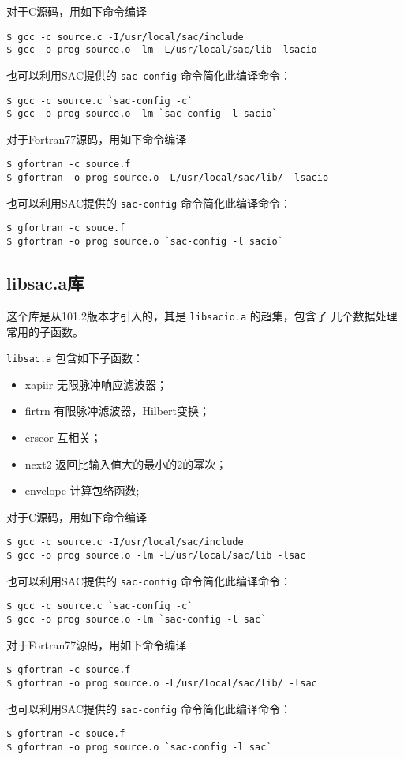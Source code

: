 对于C源码，用如下命令编译
\begin{verbatim}
$ gcc -c source.c -I/usr/local/sac/include
$ gcc -o prog source.o -lm -L/usr/local/sac/lib -lsacio
\end{verbatim}
也可以利用SAC提供的 \texttt{sac-config} 命令简化此编译命令：
\begin{verbatim}
$ gcc -c source.c `sac-config -c`
$ gcc -o prog source.o -lm `sac-config -l sacio`
\end{verbatim}

对于Fortran77源码，用如下命令编译
\begin{verbatim}
$ gfortran -c source.f
$ gfortran -o prog source.o -L/usr/local/sac/lib/ -lsacio
\end{verbatim}
也可以利用SAC提供的 \texttt{sac-config} 命令简化此编译命令：
\begin{verbatim}
$ gfortran -c souce.f
$ gfortran -o prog source.o `sac-config -l sacio`
\end{verbatim}

\subsection{libsac.a库}
这个库是从101.2版本才引入的，其是 \texttt{libsacio.a} 的超集，包含了
几个数据处理常用的子函数。

\texttt{libsac.a} 包含如下子函数：
\begin{itemize}
\item xapiir  无限脉冲响应滤波器；
\item firtrn  有限脉冲滤波器，Hilbert变换；
\item crscor  互相关；
\item next2   返回比输入值大的最小的2的幂次；
\item envelope 计算包络函数;
\end{itemize}

对于C源码，用如下命令编译
\begin{verbatim}
$ gcc -c source.c -I/usr/local/sac/include
$ gcc -o prog source.o -lm -L/usr/local/sac/lib -lsac
\end{verbatim}
也可以利用SAC提供的 \texttt{sac-config} 命令简化此编译命令：
\begin{verbatim}
$ gcc -c source.c `sac-config -c`
$ gcc -o prog source.o -lm `sac-config -l sac`
\end{verbatim}

对于Fortran77源码，用如下命令编译
\begin{verbatim}
$ gfortran -c source.f
$ gfortran -o prog source.o -L/usr/local/sac/lib/ -lsac
\end{verbatim}
也可以利用SAC提供的 \texttt{sac-config} 命令简化此编译命令：
\begin{verbatim}
$ gfortran -c souce.f
$ gfortran -o prog source.o `sac-config -l sac`
\end{verbatim}

